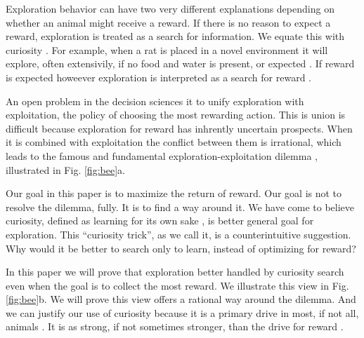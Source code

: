 Exploration behavior can have two very different explanations depending on whether an animal might receive a reward. If there is no reason to expect a reward, exploration is treated as a search for information. We equate this with curiosity \cite{Berlyne1950,Schmidhuber1991,Kidd2015,Jaegle2019,Friston2016,Sumner2019,Calhoun2014,Wang2019,Auersperg2015}. For example, when a rat is placed in a novel environment it will explore, often extensivily, if no food and water is present, or expected \cite{Berlyne1950}. If reward is expected howeever exploration is interpreted as a search for reward \cite{Gupta2006,Sutton2018,Woodgate2017,Lee2011a,Schulz2018a,Calhoun2014}.

An open problem in the decision sciences it to unify exploration with exploitation, the policy of choosing the most rewarding action. This is union is difficult because exploration for reward has inhrently uncertain prospects. When it is combined with exploitation the conflict between them is irrational, which leads to the famous and fundamental exploration-exploitation dilemma \citep{Kelly1956,Berger-Tal2014,Dayan1996,Thrun1992,Mehlhorn2015,Kobayashi2019}, illustrated in Fig. \ref{fig:bee}a.

Our goal in this paper is to maximize the return of reward. Our goal is not to resolve the dilemma, fully. It is to find a way around it. We have come to believe curiosity, defined as learning for its own sake \cite{Loewenstein1994,Kidd2015,Gopnik2020}, is better general goal for exploration. This ``curiosity trick'', as we call it, is a counterintuitive suggestion. Why would it be better to search only to learn, instead of optimizing for reward? 

In this paper we will prove that exploration better handled by curiosity search even when the goal is to collect the most reward. We illustrate this view in Fig. \ref{fig:bee}b. We will prove this view offers a rational way around the dilemma. And we can justify our use of curiosity because it is a primary drive in most, if not all, animals \cite{Berlyne1950,Loewenstein1994,Inglis2001}. It is as strong, if not sometimes stronger, than the drive for reward \cite{Loewenstein1994,Kidd2015,Gottlieb2018,Sumner2019,Gopnik2020,Song2019,Wang2019}.

